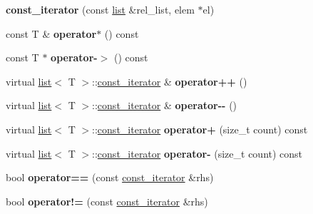 \begin{DoxyCompactItemize}
\item 
\mbox{\label{classmystl_1_1list_1_1const__iterator_a938ad18b1607473e33cc2cc13ec7e547}} 
{\bfseries const\+\_\+iterator} (const \hyperlink{classmystl_1_1list}{list} \&rel\+\_\+list, elem $\ast$el)
\item 
\mbox{\label{classmystl_1_1list_1_1const__iterator_a5f6c4abadb4d698ed1e169623f64bd3a}} 
const T \& {\bfseries operator$\ast$} () const
\item 
\mbox{\label{classmystl_1_1list_1_1const__iterator_a44fa098d64a067dceec7e24d78cae017}} 
const T $\ast$ {\bfseries operator-\/$>$} () const
\item 
\mbox{\label{classmystl_1_1list_1_1const__iterator_a710a6c6bc18883845e6294ce28cdfbeb}} 
virtual \hyperlink{classmystl_1_1list}{list}$<$ T $>$\+::\hyperlink{classmystl_1_1list_1_1const__iterator}{const\+\_\+iterator} \& {\bfseries operator++} ()
\item 
\mbox{\label{classmystl_1_1list_1_1const__iterator_aecda6482ded31830dadb990976facfac}} 
virtual \hyperlink{classmystl_1_1list}{list}$<$ T $>$\+::\hyperlink{classmystl_1_1list_1_1const__iterator}{const\+\_\+iterator} \& {\bfseries operator-\/-\/} ()
\item 
\mbox{\label{classmystl_1_1list_1_1const__iterator_a81a63844446bda3d69393e0f36469a96}} 
virtual \hyperlink{classmystl_1_1list}{list}$<$ T $>$\+::\hyperlink{classmystl_1_1list_1_1const__iterator}{const\+\_\+iterator} {\bfseries operator+} (size\+\_\+t count) const
\item 
\mbox{\label{classmystl_1_1list_1_1const__iterator_a91f4201b3f8a2b7b6a765c800829159c}} 
virtual \hyperlink{classmystl_1_1list}{list}$<$ T $>$\+::\hyperlink{classmystl_1_1list_1_1const__iterator}{const\+\_\+iterator} {\bfseries operator-\/} (size\+\_\+t count) const
\item 
\mbox{\label{classmystl_1_1list_1_1const__iterator_a5e288d3029a91d40e7f37840f64b2875}} 
bool {\bfseries operator==} (const \hyperlink{classmystl_1_1list_1_1const__iterator}{const\+\_\+iterator} \&rhs)
\item 
\mbox{\label{classmystl_1_1list_1_1const__iterator_aa6221929b943a95757cf9fe5fd6d5175}} 
bool {\bfseries operator!=} (const \hyperlink{classmystl_1_1list_1_1const__iterator}{const\+\_\+iterator} \&rhs)
\end{DoxyCompactItemize}
